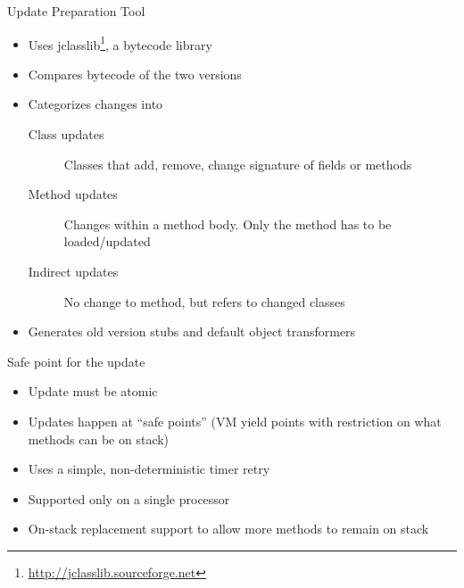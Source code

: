 \begin{frame}[t,fragile,label=offline]{Update Preparation Tool}%
\vspace{-2ex}
\vspace{-2ex}
\begin{itemize}
\item Uses jclasslib\footnote{\url{http://jclasslib.sourceforge.net}}, a
bytecode library
\item Compares bytecode of the two versions
\item Categorizes changes into
  \begin{description}
  \item[Class updates] Classes that add, remove, change signature of fields
                       or methods
  \item[Method updates] Changes within a method body. Only the method has
                        to be loaded/updated
  \item[Indirect updates] No change to method, but refers to changed
                          classes
  \end{description}
\item Generates old version stubs and default object transformers
\end{itemize}
\end{frame}

\begin{frame}[t,fragile,label=suspend]{Safe point for the update}%
\begin{itemize}
\item Update must be atomic
\item Updates happen at ``safe points'' (VM yield points with restriction
      on what methods can be on stack)
\item Uses a simple, non-deterministic timer retry
\item<2-> Supported only on a single processor
\item<2-> On-stack replacement support to allow more methods to remain on
          stack
\end{itemize}
\end{frame}

